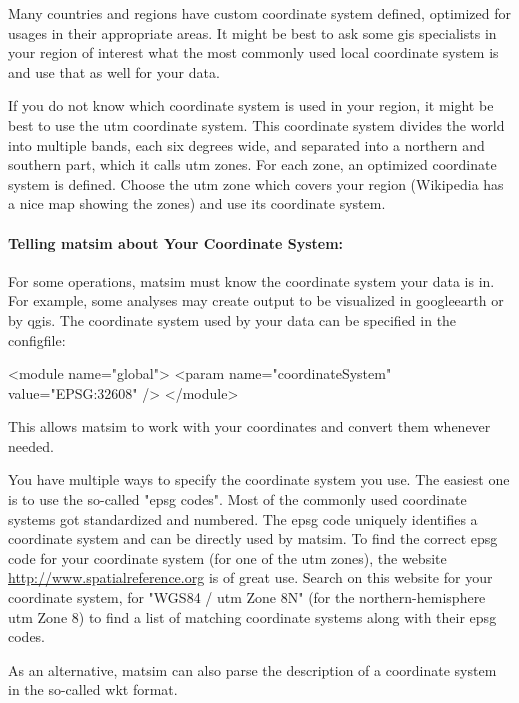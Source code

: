 Many countries and regions have custom coordinate system defined, optimized for usages in their appropriate areas. It might be best to ask some \gls{gis} specialists in your region of interest what the most commonly used local coordinate system is and use that as well for your data.

If you do not
know which coordinate system is used in your region, it might be best to use the \gls{utm} coordinate system. This coordinate system divides the world into multiple bands, each six degrees wide, and separated into a northern and southern part, which it calls \gls{utm} zones. For each zone, an optimized coordinate system is defined. Choose the \gls{utm} zone which covers your region (Wikipedia has a nice map showing the zones) and use its coordinate system. 

\paragraph{Telling \gls{matsim} about Your Coordinate System:}

For some operations, \gls{matsim} must know the coordinate system your data is in. For example, some analyses may create output to be visualized in \gls{googleearth} or by \gls{qgis}.
The coordinate system used by your data can be specified in the \gls{configfile}:
\begin{xml}
<module name="global"> 
  <param name="coordinateSystem" value="EPSG:32608" /> 
</module>
\end{xml}
This allows \gls{matsim} to work with your coordinates and convert them whenever needed. 

You have multiple ways to specify the coordinate system you use. The easiest one is to use the so-called "\gls{epsg} codes". Most of the commonly used coordinate systems got standardized and numbered. The \gls{epsg} code uniquely identifies a coordinate system and can be directly used by \gls{matsim}. To find the correct \gls{epsg} code for your coordinate system (\eg for one of the \gls{utm} zones), the website \url{http://www.spatialreference.org} is of great use. Search on this website for your coordinate system, \eg for "WGS84 / \gls{utm} Zone 8N" (for the northern-hemisphere \gls{utm} Zone 8) to find a list of matching coordinate systems along with their \gls{epsg} codes.

As an alternative, \gls{matsim} can also parse the description of a coordinate system in the so-called \gls{wkt} format. 

